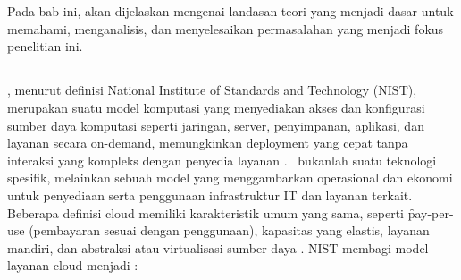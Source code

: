 \chapter{\babDua}

Pada bab ini, akan dijelaskan mengenai landasan teori yang menjadi dasar untuk memahami, menganalisis, dan menyelesaikan permasalahan yang menjadi fokus penelitian ini.

\section{\cc}
\cc, menurut definisi National Institute of Standards and Technology (NIST), merupakan suatu model komputasi yang menyediakan akses dan konfigurasi sumber daya komputasi seperti jaringan, server, penyimpanan, aplikasi, dan layanan secara on-demand, memungkinkan deployment yang cepat tanpa interaksi yang kompleks dengan penyedia layanan \cite{mell2009nist}. \cc\ bukanlah suatu teknologi spesifik, melainkan sebuah model yang menggambarkan operasional dan ekonomi untuk penyediaan serta penggunaan infrastruktur IT dan layanan terkait. Beberapa definisi cloud memiliki karakteristik umum yang sama, seperti \f{pay-per-use} (pembayaran sesuai dengan penggunaan), kapasitas yang elastis, layanan mandiri, dan abstraksi atau virtualisasi sumber daya \cite{Buyya_Broberg_Goscinski_2011}. NIST membagi model layanan cloud menjadi \cite{mell2009nist}:

